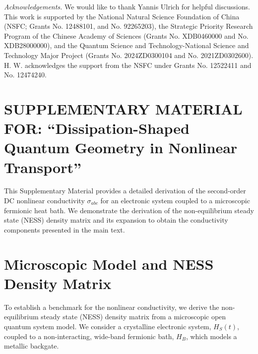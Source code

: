 \documentclass[twocolumn, prx, reprint, amsfonts, amsmath, amssymb, longbibliography, floatfix, aps]{revtex4-2}
\begin{document}
\medskip

\textit{\color{blue}Acknowledgements.}
We would like to thank Yannis Ulrich for helpful discussions.
This work is supported by the National Natural Science Foundation of China (NSFC; Grants No. 12488101, and No. 92265203), the Strategic Priority Research Program of the Chinese Academy of Sciences (Grants No. XDB0460000 and No. XDB28000000), and the Quantum Science and Technology-National Science and Technology Major Project (Grants No. 2024ZD0300104 and No. 2021ZD0302600). H. W. acknowledges the support from the NSFC under Grants No. 12522411 and No. 12474240.



\clearpage

\newpage

\appendix

\renewcommand{\theequation}{\thesection-\arabic{equation}}
\renewcommand{\thefigure}{\thesection-\arabic{figure}}
\renewcommand{\thetable}{\thesection-\Roman{table}}

\onecolumngrid

\section*{SUPPLEMENTARY MATERIAL FOR: ``Dissipation-Shaped Quantum Geometry in Nonlinear Transport''}

This Supplementary Material provides a detailed derivation of the second-order DC nonlinear conductivity $\sigma_{abc}$ for an electronic system coupled to a microscopic fermionic heat bath. We demonstrate the derivation of the non-equilibrium steady state (NESS) density matrix and its expansion to obtain the conductivity components presented in the main text.


\section{Microscopic Model and NESS Density Matrix}
\label{S-A}

To establish a benchmark for the nonlinear conductivity, we derive the non-equilibrium steady state (NESS) density matrix from a microscopic open quantum system model. We consider a crystalline electronic system, $H_S(t)$, coupled to a non-interacting, wide-band fermionic bath, $H_B$, which models a metallic backgate.
\end{document}
